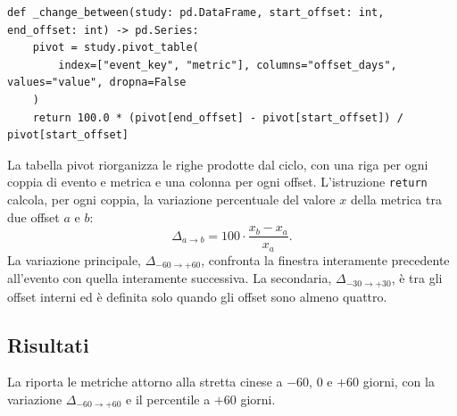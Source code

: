 \begin{listing}[H]
\begin{verbatim}
def _change_between(study: pd.DataFrame, start_offset: int, end_offset: int) -> pd.Series:
    pivot = study.pivot_table(
        index=["event_key", "metric"], columns="offset_days", values="value", dropna=False
    )
    return 100.0 * (pivot[end_offset] - pivot[start_offset]) / pivot[start_offset]
\end{verbatim}
\caption{\texttt{\_change\_between}}
\label{lst:change-between}
\end{listing}

La tabella pivot riorganizza le righe prodotte dal ciclo, con una riga per ogni coppia di evento e metrica e una colonna per ogni offset. L'istruzione \texttt{return} calcola, per ogni coppia, la variazione percentuale del valore $x$ della metrica tra due offset $a$ e $b$:
\begin{equation}
    \Delta_{a\to b} = 100\cdot\frac{x_b-x_a}{x_a}.
    \label{eq:pct-change}
\end{equation}
La variazione principale, $\Delta_{-60\to+60}$, confronta la finestra interamente precedente all'evento con quella interamente successiva. La secondaria, $\Delta_{-30\to+30}$, è tra gli offset interni ed è definita solo quando gli offset sono almeno quattro.

\subsection{Risultati}

La  riporta le metriche attorno alla stretta cinese a $-60$, $0$ e $+60$ giorni, con la variazione $\Delta_{-60\to+60}$ e il percentile a $+60$ giorni.

